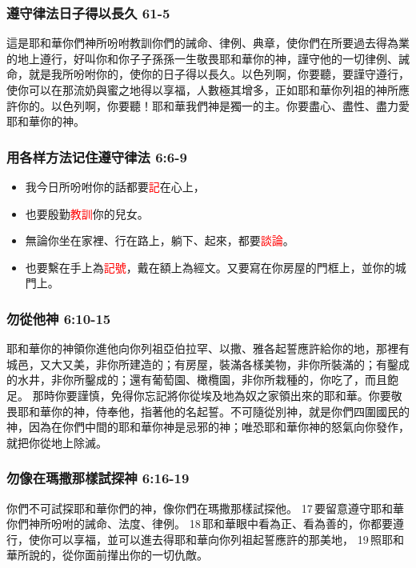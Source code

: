 \subsubsection{遵守律法日子得以長久 61-5}
這是耶和華你們神所吩咐教訓你們的誡命、律例、典章，使你們在所要過去得為業的地上遵行，好叫你和你子子孫孫一生敬畏耶和華你的神，謹守他的一切律例、誡命，就是我所吩咐你的，使你的日子得以長久。以色列啊，你要聽，要謹守遵行，使你可以在那流奶與蜜之地得以享福，人數極其增多，正如耶和華你列祖的神所應許你的。以色列啊，你要聽！耶和華我們神是獨一的主。你要盡心、盡性、盡力愛耶和華你的神。

\subsubsection{用各样方法记住遵守律法 6:6-9}
\begin{itemize} 
\itemsep-.35em 
\item 我今日所吩咐你的話都要\textcolor{red}{記}在心上，
\item 也要殷勤\textcolor{red}{教訓}你的兒女。
\item 無論你坐在家裡、行在路上，躺下、起來，都要\textcolor{red}{談論}。
\item 也要繫在手上為\textcolor{red}{記號}，戴在額上為經文。又要寫在你房屋的門框上，並你的城門上。
\end{itemize}

\subsubsection{勿從他神 6:10-15}
耶和華你的神領你進他向你列祖亞伯拉罕、以撒、雅各起誓應許給你的地，那裡有城邑，又大又美，非你所建造的；有房屋，裝滿各樣美物，非你所裝滿的；有鑿成的水井，非你所鑿成的；還有葡萄園、橄欖園，非你所栽種的，你吃了，而且飽足。
那時你要謹慎，免得你忘記將你從埃及地為奴之家領出來的耶和華。你要敬畏耶和華你的神，侍奉他，指著他的名起誓。不可隨從別神，就是你們四圍國民的神，因為在你們中間的耶和華你神是忌邪的神；唯恐耶和華你神的怒氣向你發作，就把你從地上除滅。

\subsubsection{勿像在瑪撒那樣試探神 6:16-19}
你們不可試探耶和華你們的神，像你們在瑪撒那樣試探他。 17 要留意遵守耶和華你們神所吩咐的誡命、法度、律例。 18 耶和華眼中看為正、看為善的，你都要遵行，使你可以享福，並可以進去得耶和華向你列祖起誓應許的那美地， 19 照耶和華所說的，從你面前攆出你的一切仇敵。


